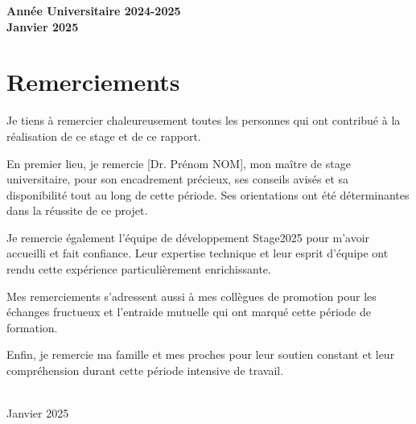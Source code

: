 \documentclass[12pt,a4paper]{report}
\begin{document}
\begin{titlepage}
\vfill

{\large\bfseries Année Universitaire 2024-2025}\\[0.5cm]
{\large\bfseries Janvier 2025}

\end{titlepage}

\newpage
\thispagestyle{empty}
\vspace*{2cm}

\section*{Remerciements}

Je tiens à remercier chaleureusement toutes les personnes qui ont contribué à la réalisation de ce stage et de ce rapport.

En premier lieu, je remercie [Dr. Prénom NOM], mon maître de stage universitaire, pour son encadrement précieux, ses conseils avisés et sa disponibilité tout au long de cette période. Ses orientations ont été déterminantes dans la réussite de ce projet.

Je remercie également l'équipe de développement Stage2025 pour m'avoir accueilli et fait confiance. Leur expertise technique et leur esprit d'équipe ont rendu cette expérience particulièrement enrichissante.

Mes remerciements s'adressent aussi à mes collègues de promotion pour les échanges fructueux et l'entraide mutuelle qui ont marqué cette période de formation.

Enfin, je remercie ma famille et mes proches pour leur soutien constant et leur compréhension durant cette période intensive de travail.

\vfill

\begin{flushright}
\\
Janvier 2025
\end{flushright}

\newpage

\tableofcontents
\newpage

\listoffigures
\newpage
\listoftables
\newpage
\end{document}
